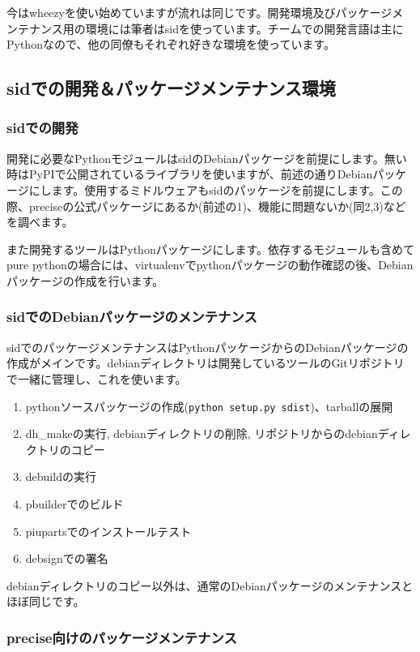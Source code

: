 \documentclass[mingoth,a4paper,twoside]{jsarticle}
\begin{document}
今はwheezyを使い始めていますが流れは同じです。開発環境及びパッケージメンテナンス用の環境には筆者はsidを使っています。チームでの開発言語は主にPythonなので、他の同僚もそれぞれ好きな環境を使っています。

\subsection{sidでの開発＆パッケージメンテナンス環境}
\subsubsection{sidでの開発}

開発に必要なPythonモジュールはsidのDebianパッケージを前提にします。無い時はPyPIで公開されているライブラリを使いますが、前述の通りDebianパッケージにします。使用するミドルウェアもsidのパッケージを前提にします。この際、preciseの公式パッケージにあるか(前述の1)、機能に問題ないか(同2,3)などを調べます。

また開発するツールはPythonパッケージにします。依存するモジュールも含めてpure pythonの場合には、virtualenvでpythonパッケージの動作確認の後、Debianパッケージの作成を行います。

\subsubsection{sidでのDebianパッケージのメンテナンス}

sidでのパッケージメンテナンスはPythonパッケージからのDebianパッケージの作成がメインです。debianディレクトリは開発しているツールのGitリポジトリで一緒に管理し、これを使います。

\begin{enumerate}
\item{pythonソースパッケージの作成(\texttt{python setup.py sdist})、tarballの展開}
\item{dh\_makeの実行, debianディレクトリの削除, リポジトリからのdebianディレクトリのコピー}
\item{debuildの実行}
\item{pbuilderでのビルド}
\item{piupartsでのインストールテスト}
\item{debsignでの署名}
\end{enumerate}

debianディレクトリのコピー以外は、通常のDebianパッケージのメンテナンスとほぼ同じです。

\subsubsection{precise向けのパッケージメンテナンス}
\end{document}
